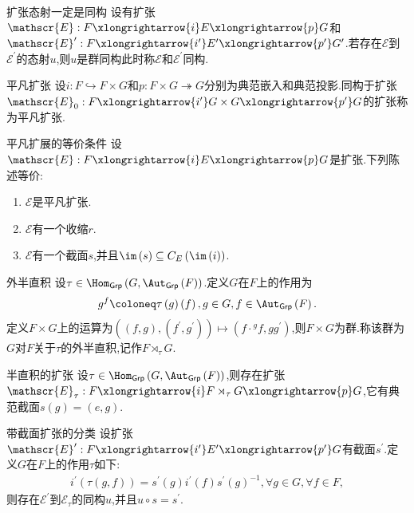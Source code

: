 \begin{proposition}{扩张态射一定是同构}{}
	设有扩张$\mathscr{E}:F\xlongrightarrow{i}E\xlongrightarrow{p}G$和$\mathscr{E}^{\prime}:F\xlongrightarrow{i^{\prime}}E^{\prime}\xlongrightarrow{p^{\prime}}G^{\prime}$.若存在$\mathscr{E}$到$\mathscr{E}^{\prime}$的态射$u$,则$u$是群同构此时称$\mathscr{E}$和$\mathscr{E}^{\prime}$同构.
\end{proposition}

\begin{proposition}{平凡扩张}{}
	设$i:F\hookrightarrow F\times G$和$p:F\times G\twoheadrightarrow G$分别为典范嵌入和典范投影.同构于扩张$\mathscr{E}_{0}:F\xlongrightarrow{i^{\prime}}G\times G\xlongrightarrow{p^{\prime}}G$的扩张称为平凡扩张.
\end{proposition}

\begin{proposition}{平凡扩展的等价条件}{}
	设$\mathscr{E}:F\xlongrightarrow{i}E\xlongrightarrow{p}G$是扩张.下列陈述等价:
	\begin{enumerate}
		\item $\mathscr{E}$是平凡扩张.
		\item $\mathscr{E}$有一个收缩$r$.
		\item $\mathscr{E}$有一个截面$s$,并且$\im\left(s\right)\subseteq C_{E}\left(\im\left(i\right)\right)$.
	\end{enumerate}
\end{proposition}

\begin{definition}{外半直积}{}
	设$\tau\in\Hom_{\mathsf{Grp}}\left(G,\Aut_{\mathsf{Grp}}\left(F\right)\right)$.定义$G$在$F$上的作用为
	\begin{align*}
		{g}^{f}\coloneq\tau\left(g\right)\left(f\right),g\in G,f\in\Aut_{\mathsf{Grp}}\left(F\right).
	\end{align*}
	定义$F\times G$上的运算为$\left(\left(f,g\right),\left(f^{\prime},g^{\prime}\right)\right)\mapsto\left(f\cdot {}^{g}f,gg^{\prime}\right)$,则$F\times G$为群.称该群为$G$对$F$关于$\tau$的外半直积,记作$F\rtimes_{\tau}G$.
\end{definition}

\begin{proposition}{半直积的扩张}{}
	设$\tau\in\Hom_{\mathsf{Grp}}\left(G,\Aut_{\mathsf{Grp}}\left(F\right)\right)$,则存在扩张$\mathscr{E}_{\tau}:F\xlongrightarrow{i}F\rtimes_{\tau}G\xlongrightarrow{p}G$,它有典范截面$s\left(g\right)=\left(e,g\right)$.
\end{proposition}

\begin{proposition}{带截面扩张的分类}{}
	设扩张$\mathscr{E}^{\prime}:F\xlongrightarrow{i^{\prime}}E^{\prime}\xlongrightarrow{p^{\prime}}G$有截面$s^{\prime}$.定义$G$在$F$上的作用$\tau$如下:
	\begin{align*}
		i^{\prime}\left(\tau\left(g,f\right)\right)=s^{\prime}\left(g\right)i^{\prime}\left(f\right)s^{\prime}\left(g\right)^{-1},\forall g\in G,\forall f\in F,
	\end{align*}
	则存在$\mathscr{E}^{\prime}$到$\mathscr{E}_{\tau}$的同构$u$,并且$u\circ s=s^{\prime}$.
\end{proposition}

